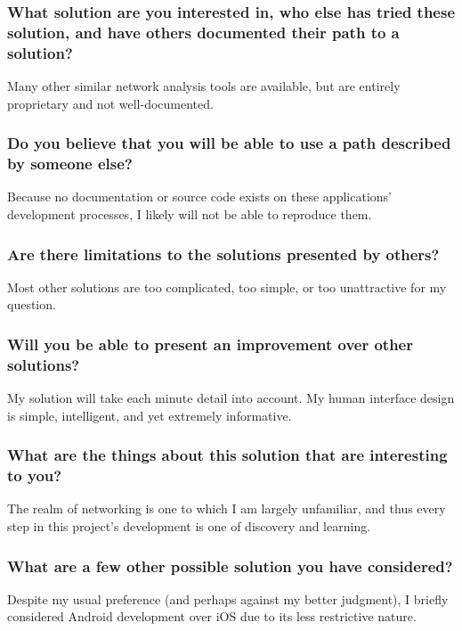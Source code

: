 \documentclass[letterpaper]{article}            %
\begin{document}
\subsubsection{What solution are you interested in, who else has tried these solution, and have others documented their path to a solution?}

Many other similar network analysis tools are available, but are entirely proprietary and not well-documented.

\subsubsection{Do you believe that you will be able to use a path described by someone else?}

Because no documentation or source code exists on these applications' development processes, I likely will not be able to reproduce them.

\subsubsection{Are there limitations to the solutions presented by others?}

Most other solutions are too complicated, too simple, or too unattractive for my question. 

\subsubsection{Will you be able to present an improvement over other solutions?}

My solution will take each minute detail into account. My human interface design is simple, intelligent, and yet extremely informative.

\subsubsection{What are the things about this solution that are interesting to you?}

The realm of networking is one to which I am largely unfamiliar, and thus every step in this project's development is one of discovery and learning.

\subsubsection{What are a few other possible solution you have considered?}

Despite my usual preference (and perhaps against my better judgment), I briefly considered Android development over iOS due to its less restrictive nature.
\end{document}
